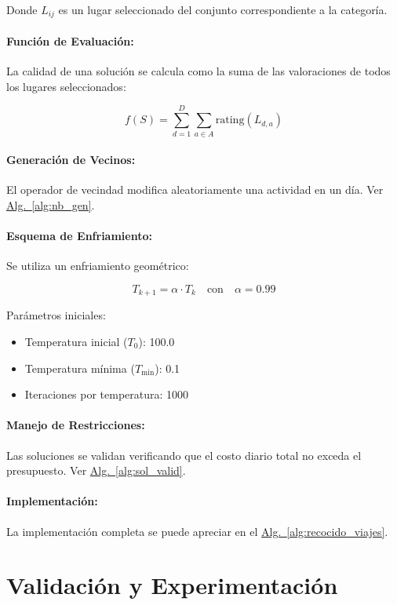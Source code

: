 \documentclass[10pt]{llncs}
\newcommand{\AlgRef}[1]{\hyperref[#1]{Alg.~\ref{#1}}}
\begin{document}
Donde $L_{ij}$ es un lugar seleccionado del conjunto correspondiente a la categoría.

\paragraph{Función de Evaluación:}
La calidad de una solución se calcula como la suma de las valoraciones de todos los lugares seleccionados:

\[
f(S) = \sum_{d=1}^{D} \sum_{a \in A} \text{rating}(L_{d,a})
\]

\paragraph{Generación de Vecinos:}
El operador de vecindad modifica aleatoriamente una actividad en un día. Ver \AlgRef{alg:nb_gen}.

\paragraph{Esquema de Enfriamiento:}
Se utiliza un enfriamiento geométrico:

\[
T_{k+1} = \alpha \cdot T_k \quad \text{con} \quad \alpha = 0.99
\]

Parámetros iniciales:
\begin{itemize}
    \item Temperatura inicial ($T_0$): 100.0
    \item Temperatura mínima ($T_{\min}$): 0.1
    \item Iteraciones por temperatura: 1000
\end{itemize}

\paragraph{Manejo de Restricciones:}
Las soluciones se validan verificando que el costo diario total no exceda el presupuesto. Ver \AlgRef{alg:sol_valid}.

\paragraph{Implementación:}
La implementación completa se puede apreciar en el \AlgRef{alg:recocido_viajes}.


\vspace{\baselineskip}
\section{Validación y Experimentación}
\end{document}
